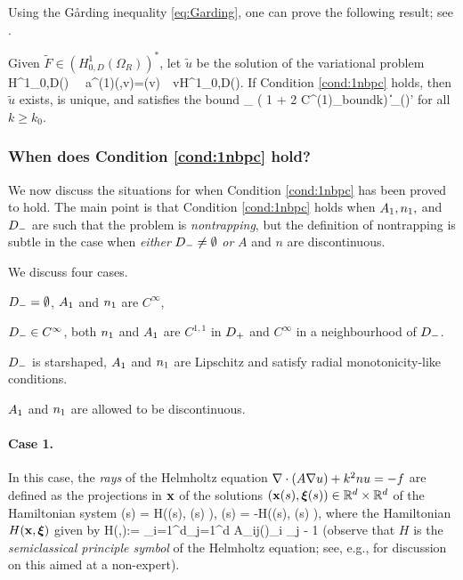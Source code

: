 Using the G\aa rding inequality \eqref{eq:Garding}, one can prove the following result; see \cite[Lemma 5.1]{GrPeSp:19}.

\label{lem:H1}
Given $\widetilde{F}\in (H^1_{0,D}(\Omega_R))^*$, let $\widetilde{u}$ be the solution of the variational problem
\beqs
{} \,\, \in H^1_{0,D}(\DR) \,\,\tst \,\,
a^{(1)}(,v)=(v) \,\, \tfa v\in H^1_{0,D}(\DR).
\eeqs
If Condition \ref{cond:1nbpc} holds, then $\widetilde{u}$ exists, is unique, and satisfies the bound
\beq\label{eq:bound2}
_{\HokDR} \leq {}\left( 1 + 2 C^{(1)}_{\rm bound}\nomax  k\right) \big\|\big\|_{(\HokDR)'}
\eeq
for all $k\geq k_0$.
\ele


\subsubsection{When does Condition \ref{cond:1nbpc} hold?}\label{sec:cond1hold}

We now discuss the situations for when Condition \ref{cond:1nbpc} has been proved to hold. The main point is that Condition \ref{cond:1nbpc} holds when $A_{1}, n_{1},$ and $D_{-}$ are such that the problem is \emph{nontrapping}, but the definition of nontrapping is subtle in the case when \emph{either} $D_{-} \neq\emptyset$ \emph{or} $A$ and $n$ are discontinuous.

We discuss four cases.
\ben
\item[Case 1:] $D_{-}=\emptyset$, $A_{1}$ and $n_{1}$ are $C^\infty$,
\item[Case 2:] $D_{-}\in C^\infty$, both $n_{1}$ and $A_{1}$ are $C^{1,1}$ in $D_{+}$ and $C^\infty$ in a neighbourhood of $D_{-}$.
\item[Case 3:] $D_{-}$ is starshaped, $A_{1}$ and $n_{1}$ are Lipschitz and satisfy radial monotonicity-like conditions.
\item[Case 4:] $A_{1}$ and $n_{1}$ are allowed to be discontinuous.
\een

\paragraph{Case 1.}
In this case, %
the \emph{rays} of the Helmholtz equation $\nabla\cdot(A\nabla u)+ k^2 nu =-f$ are defined as the projections in $\mathbf{x}$ of the solutions $(\mathbf{x}(s), \boldsymbol{\xi}(s)) \in \mathbb R^{d}\times \mathbb R^{d}$ of the Hamiltonian system
\beq\label{eq:rays}
(s) = H\big(\bx(s), \bxi(s) \big), \qquad
(s)
 = -H\big(\bx(s), \bxi(s) \big),
\eeq
where the Hamiltonian $H(\mathbf{x},\boldsymbol{\xi})$ given by 
\beqs
H(\bx,\bxi):= \sum_{i=1}^d\sum_{j=1}^{d} A_{ij}(\bx)\xi_i \xi_j - 1%
\eeqs
(observe that $H$ is the \emph{semiclassical principle symbol} of the Helmholtz equation; see, e.g., \cite[\S7]{GrPeSp:19} for discussion on this aimed at a non-expert).

